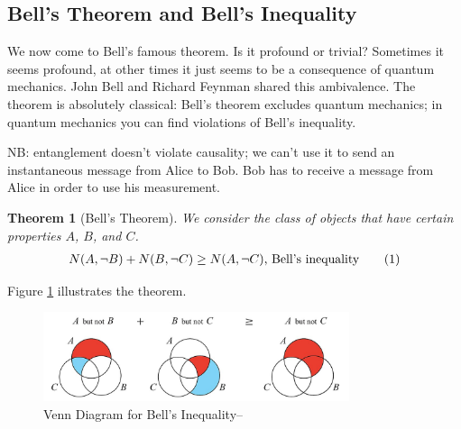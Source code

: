 \documentclass[]{article}
\newcommand\numberthis{\addtocounter{equation}{1}\tag{\theequation}}
\newtheorem{thm}{Theorem}
\begin{document}
\subsection{Bell's Theorem and Bell's Inequality}

We now come to Bell's famous theorem\cite{bell1964einstein}. Is it profound or trivial? Sometimes it seems profound, at other times it just seems to be a consequence of quantum mechanics. John Bell and Richard Feynman shared this ambivalence. The theorem is absolutely classical:  Bell's theorem excludes quantum mechanics; in quantum mechanics you can find violations of Bell's inequality.

NB: entanglement doesn't violate causality; we can't use it to send an instantaneous message from Alice to Bob. Bob has to receive a message from Alice in order to use his measurement.

\begin{thm}[Bell's Theorem]
We consider the class of objects that have certain properties $A$, $B$, and $C$.
	\begin{align*}
		N(A, \neg B) + N(B, \neg C) \ge N(A,\neg C)\text{,  Bell's inequality} \numberthis \label{eq:bell:inequality}
	\end{align*}
\end{thm}

Figure \ref{fig:bell} illustrates the theorem.
\begin{figure}[H]
	\caption{Venn Diagram for Bell's Inequality--\cite{wiki2020bell}}\label{fig:bell}
	\includegraphics[width=0.8\textwidth]{1200px-Bell's_Theorem_JCB.jpg}
\end{figure}
\end{document}
